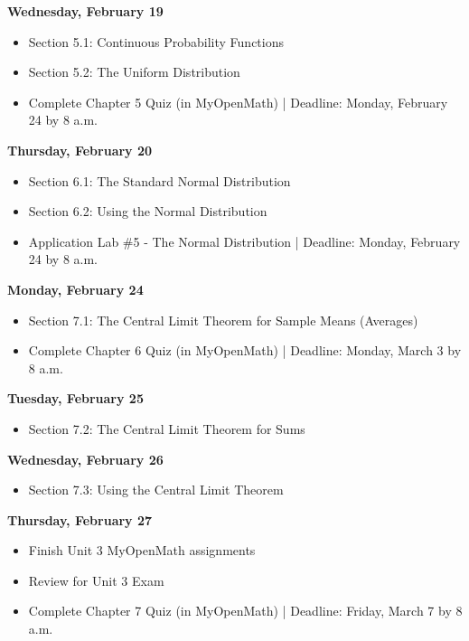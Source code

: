 \documentclass[11pt]{article}
\begin{document}
\textbf{Wednesday, February 19}

\begin{itemize}
\item Section 5.1: Continuous Probability Functions
\item Section 5.2: The Uniform Distribution
\item Complete Chapter 5 Quiz (in MyOpenMath) | Deadline: Monday, February 24 by 8 a.m.
\end{itemize}

\textbf{Thursday, February 20}

\begin{itemize}
\item Section 6.1: The Standard Normal Distribution
\item Section 6.2: Using the Normal Distribution
\item Application Lab \#5 - The Normal Distribution | Deadline: Monday, February 24 by 8 a.m.
\end{itemize}

\textbf{Monday, February 24}

\begin{itemize}
\item Section 7.1: The Central Limit Theorem for Sample Means (Averages)
\item Complete Chapter 6 Quiz (in MyOpenMath) | Deadline: Monday, March 3 by 8 a.m.
\end{itemize}

\textbf{Tuesday, February 25}

\begin{itemize}
\item Section 7.2: The Central Limit Theorem for Sums
\end{itemize}

\textbf{Wednesday, February 26}

\begin{itemize}
\item Section 7.3: Using the Central Limit Theorem
\end{itemize}

\textbf{Thursday, February 27}

\begin{itemize}
\item Finish Unit 3 MyOpenMath assignments
\item Review for Unit 3 Exam
\item Complete Chapter 7 Quiz (in MyOpenMath) | Deadline: Friday, March 7 by 8 a.m.
\end{itemize}
\end{document}
